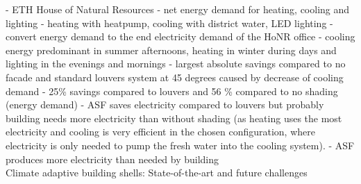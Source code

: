 	- ETH House of Natural Resources	
	- net energy demand for heating, cooling and lighting
	- heating with heatpump, cooling with district water, LED lighting
	- convert energy demand to the end electricity demand of the HoNR office
	- cooling energy predominant in summer afternoons, heating in winter during days and lighting in the evenings and mornings
	- largest absolute savings compared to no facade and standard louvers system at 45 degrees  caused by decrease of cooling demand
	- 25\% savings compared to louvers and 56 \% compared to no shading (energy demand)
	- ASF saves electricity compared to louvers but probably building needs more electricity than without shading (as heating uses the most electricity and cooling is very efficient in the chosen configuration, where electricity is only needed to pump the fresh water into the cooling system).
	- ASF produces more electricity than needed by building\\
	


Climate adaptive building shells: State-of-the-art and future challenges \cite{loonen13}\\



